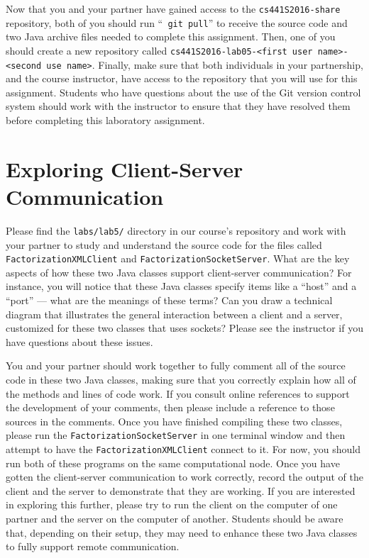 Now that you and your partner have gained access to the {\tt cs441S2016-share} repository, both of you should run ``{\tt
git pull}'' to receive the source code and two Java archive files needed to complete this assignment. Then, one of you
should create a new repository called {\tt cs441S2016-lab05-<first user name>-<second use name>}. Finally, make sure
that both individuals in your partnership, and the course instructor, have access to the repository that you will use
for this assignment. Students who have questions about the use of the Git version control system should work with the
instructor to ensure that they have resolved them before completing this laboratory assignment.

\section*{Exploring Client-Server Communication}

Please find the {\tt labs/lab5/} directory in our course's repository and work with your partner to study and understand
the source code for the files called {\tt FactorizationXMLClient} and {\tt FactorizationSocketServer}. What are the
key aspects of how these two Java classes support client-server communication? For instance, you will notice that these
Java classes specify items like a ``host'' and a ``port'' --- what are the meanings of these terms? Can you draw a
technical diagram that illustrates the general interaction between a client and a server, customized for these two
classes that uses sockets? Please see the instructor if you have questions about these issues.

You and your partner should work together to fully comment all of the source code in these two Java classes, making sure
that you correctly explain how all of the methods and lines of code work. If you consult online references to support
the development of your comments, then please include a reference to those sources in the comments. Once you have
finished compiling these two classes, please run the {\tt FactorizationSocketServer} in one terminal window and then
attempt to have the {\tt FactorizationXMLClient} connect to it. For now, you should run both of these programs on the
same computational node. Once you have gotten the client-server communication to work correctly, record the output of
the client and the server to demonstrate that they are working. If you are interested in exploring this further, please
try to run the client on the computer of one partner and the server on the computer of another. Students should be aware
that, depending on their setup, they may need to enhance these two Java classes to fully support remote communication.

